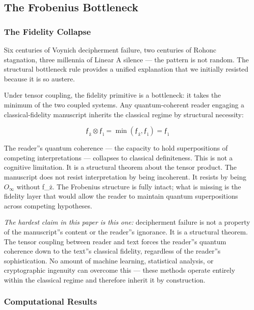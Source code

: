 \documentclass[12pt,a4paper]{article}
\begin{document}
\subsection{The Frobenius Bottleneck}

\subsubsection{The Fidelity Collapse}

Six centuries of Voynich decipherment failure, two centuries of Rohonc stagnation, three millennia of Linear A silence --- the pattern is not random. The structural bottleneck rule provides a unified explanation that we initially resisted because it is so austere.

Under tensor coupling, the fidelity primitive is a bottleneck: it takes the minimum of the two coupled systems. Any quantum-coherent reader engaging a classical-fidelity manuscript inherits the classical regime by structural necessity:

\[\text{ƒ}_{\text{ż}} \otimes \text{ƒ}_{\text{ì}} = \min(\text{ƒ}_{\text{ż}}, \text{ƒ}_{\text{ì}}) = \text{ƒ}_{\text{ì}}\]

The reader''s quantum coherence --- the capacity to hold superpositions of competing interpretations --- collapses to classical definiteness. This is not a cognitive limitation. It is a structural theorem about the tensor product. The manuscript does not resist interpretation by being incoherent. It resists by being $O_{\infty}$ without ƒ\_ż. The Frobenius structure is fully intact; what is missing is the fidelity layer that would allow the reader to maintain quantum superpositions across competing hypotheses.

\emph{The hardest claim in this paper is this one:} decipherment failure is not a property of the manuscript''s content or the reader''s ignorance. It is a structural theorem. The tensor coupling between reader and text forces the reader''s quantum coherence down to the text''s classical fidelity, regardless of the reader''s sophistication. No amount of machine learning, statistical analysis, or cryptographic ingenuity can overcome this --- these methods operate entirely within the classical regime and therefore inherit it by construction.

\subsubsection{Computational Results}
\end{document}
